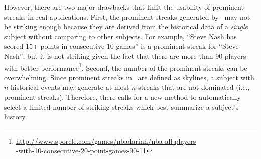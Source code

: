 %
%

However, there are two major drawbacks that limit the usability
of prominent streaks in real applications.
First, the prominent streaks generated by~\cite{zhang2014discovering} may not be striking enough because they are derived from the historical data of a \emph{single} subject without comparing to other subjects.
For example, 
``Steve Nash has scored 15+ points in consecutive 10 games'' is a prominent streak for ``Steve Nash'', but it is not striking given the fact that there are more than 90 players with better performance\footnote{\url{http://www.sporcle.com/games/nbadarinh/nba-all-players} \\ \url{-with-10-consecutive-20-point-games-90-11}}. 
Second, the number of the prominent streaks can be overwhelming. 
Since prominent streaks in~\cite{zhang2014discovering} are defined as skylines,
a subject with $n$ historical events may generate at most $n$ streaks that are not dominated (i.e., prominent streaks).
Therefore, there calls for a new method to automatically select a limited number of striking streaks which best summarize a subject's history.

